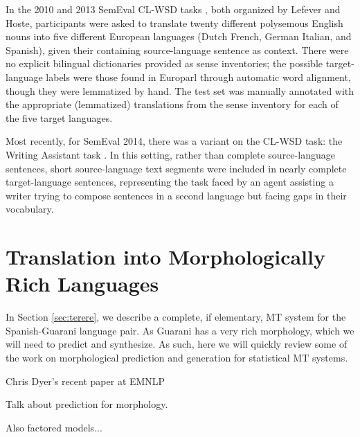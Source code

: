 In the 2010 and 2013 SemEval CL-WSD tasks
\cite{lefever-hoste:2010:SemEval,task10}, both organized by Lefever and Hoste,
participants were asked to translate twenty different polysemous English nouns
into five different European languages (Dutch French, German Italian, and
Spanish), given their containing source-language sentence as context. There
were no explicit bilingual dictionaries provided as sense inventories; the
possible target-language labels were those found in Europarl \cite{europarl}
through automatic word alignment, though they were lemmatized by hand. The test
set was manually annotated with the appropriate (lemmatized) translations from
the sense inventory for each of the five target languages.

Most recently, for SemEval 2014, there was a variant on the CL-WSD task: the
Writing Assistant task \cite{vangompel-EtAl:2014:SemEval}. In this setting,
rather than complete source-language sentences, short source-language text
segments were included in nearly complete target-language sentences,
representing the task faced by an agent assisting a writer trying to compose
sentences in a second language but facing gaps in their vocabulary.

\section{Translation into Morphologically Rich Languages}
In Section \ref{sec:terere}, we describe a complete, if elementary, MT system
for the Spanish-Guarani language pair. As Guarani has a very rich morphology,
which we will need to predict and synthesize. As such, here we will quickly
review some of the work on morphological prediction and generation for
statistical MT systems.

Chris Dyer's recent paper at EMNLP
\cite{chahuneau:2013:emnlp}

Talk about prediction for morphology.
\cite{toutanova-suzuki-ruopp:2008:ACLMain}

Also factored models...
\cite{yeniterzi-oflazer:2010:ACL}
